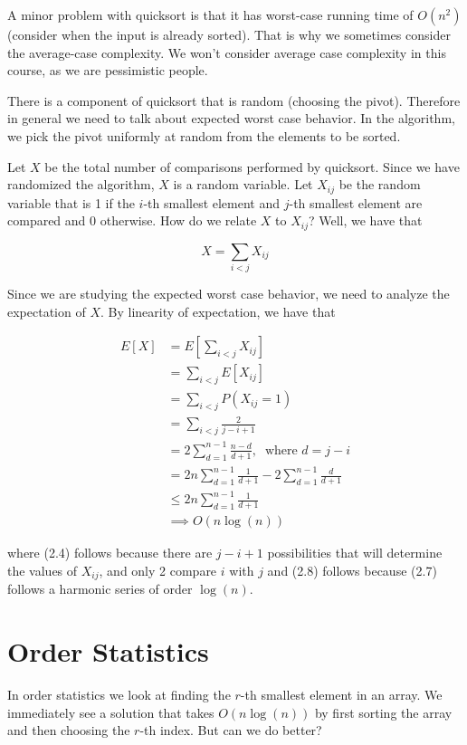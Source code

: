 A minor problem with quicksort is that it has worst-case running time
of $O(n^2)$ (consider when the input is already sorted). That is why
we sometimes consider the average-case complexity. We won't consider
average case complexity in this course, as we are pessimistic people.

There is a component of quicksort that is random (choosing the pivot).
Therefore in general we need to talk about expected worst case
behavior. In the algorithm, we pick the pivot uniformly at random from
the elements to be sorted.

Let $X$ be the total number of comparisons performed by quicksort.
Since we have randomized the algorithm, $X$ is a random variable.
Let $X_{ij}$ be the random variable that is 1 if the $i$-th smallest
element and $j$-th smallest element are compared and 0 otherwise.
How do we relate $X$ to $X_{ij}$? Well, we have that

$$
X = \sum_{i<j} X_{ij}
$$

Since we are studying the expected worst case behavior, we need to
analyze the expectation of $X$. By linearity of expectation, we have
that 

\begin{align}
E[X] &= E[\sum_{i<j} X_{ij}] \\
     &= \sum_{i<j} E[X_{ij}] \\ 
     &= \sum_{i<j} P(X_{ij} = 1) \\
     &= \sum_{i<j} \frac{2}{j - i + 1} \\
     &= 2 \sum_{d = 1}^{n - 1} \frac{n-d}{d+1}, \;\; \text{where $d =
     j -
     i$} \\
     &= 2n\sum_{d = 1}^{n - 1}\frac{1}{d+1} - 2\sum_{d = 1}^{n -
     1}\frac{d}{d+1} \\
     &\leq 2n\sum_{d = 1}^{n - 1}\frac{1}{d+1} \\
     &\implies O(n\log(n))
\end{align}

where (2.4) follows because there are $j - i + 1$ possibilities that
will determine the
values of $X_{ij}$, and only 2 compare $i$ with $j$ and (2.8) follows
because (2.7) follows a harmonic series of order $\log(n)$.

\section{Order Statistics}

In order statistics we look at finding the $r$-th smallest element in
an array. We immediately see a solution that takes $O(n\log(n))$ by
first sorting the array and then choosing the $r$-th index. But can we
do better?

